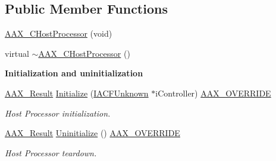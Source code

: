 \subsection*{Public Member Functions}
\begin{DoxyCompactItemize}
\item 
\mbox{\hyperlink{a01485_ab9c80cadc9eee6d44713eac97d0a4e09}{A\+A\+X\+\_\+\+C\+Host\+Processor}} (void)
\item 
virtual \mbox{\hyperlink{a01485_a292b055693eace03d45b3a550dbefa50}{$\sim$\+A\+A\+X\+\_\+\+C\+Host\+Processor}} ()
\end{DoxyCompactItemize}
\begin{Indent}\textbf{ Initialization and uninitialization}\par
\begin{DoxyCompactItemize}
\item 
\mbox{\hyperlink{a00392_a4d8f69a697df7f70c3a8e9b8ee130d2f}{A\+A\+X\+\_\+\+Result}} \mbox{\hyperlink{a01485_afa9d83145a510fb3e37a4831b0f2b3c6}{Initialize}} (\mbox{\hyperlink{a01409}{I\+A\+C\+F\+Unknown}} $\ast$i\+Controller) \mbox{\hyperlink{a00392_ac2f24a5172689ae684344abdcce55463}{A\+A\+X\+\_\+\+O\+V\+E\+R\+R\+I\+DE}}
\begin{DoxyCompactList}\small\item\em Host Processor initialization. \end{DoxyCompactList}\item 
\mbox{\hyperlink{a00392_a4d8f69a697df7f70c3a8e9b8ee130d2f}{A\+A\+X\+\_\+\+Result}} \mbox{\hyperlink{a01485_a0152f823c0f40fb55230ee4cde0dac68}{Uninitialize}} () \mbox{\hyperlink{a00392_ac2f24a5172689ae684344abdcce55463}{A\+A\+X\+\_\+\+O\+V\+E\+R\+R\+I\+DE}}
\begin{DoxyCompactList}\small\item\em Host Processor teardown. \end{DoxyCompactList}\end{DoxyCompactItemize}
\end{Indent}
